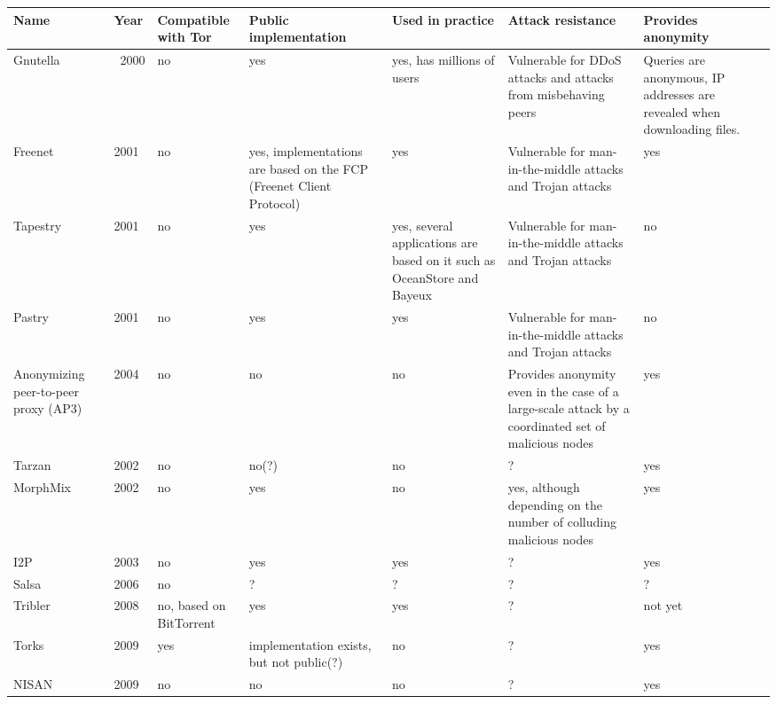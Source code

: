 \begin{center}
    \begin{longtable}{ | p{1.9cm} | p{0.8cm} | p{1.6cm} | p{2.2cm} | p{2.0cm} | p{2cm} | p{2cm} | p{2cm} |}
    \hline
    	Name & Year & Compatible with Tor & Public implementation & Used in practice & Attack resistance & Provides anonymity \\ \hline
	Gnutella & ~2000 & no & yes & yes, has millions of users & Vulnerable for DDoS attacks and attacks from misbehaving peers & Queries are anonymous, IP addresses are revealed when downloading files.\\ \hline
	Freenet & 2001 & no & yes, implementations are based on the FCP (Freenet Client Protocol) & yes & Vulnerable for man-in-the-middle attacks and Trojan attacks & yes\\ \hline
	Tapestry & 2001 & no & yes & yes, several applications are based on it such as OceanStore and Bayeux & Vulnerable for man-in-the-middle attacks and Trojan attacks & no\\ \hline
	Pastry & 2001 & no & yes & yes & Vulnerable for man-in-the-middle attacks and Trojan attacks & no\\ \hline
	Anonymizing peer-to-peer proxy (AP3) & 2004 & no & no & no & Provides anonymity even in the case of a large-scale attack by a coordinated set of malicious nodes & yes\\ \hline
	Tarzan & 2002 & no & no(?) & no & ? & yes\\ \hline
	MorphMix & 2002 & no & yes & no & yes, although depending on the number of colluding malicious nodes & yes\\ \hline
	I2P & 2003 & no & yes & yes & ? & yes\\ \hline
	Salsa & 2006 & no & ? & ? & ? & ?\\ \hline
	Tribler & 2008 & no, based on BitTorrent & yes & yes & ? & not yet\\ \hline
	Torks & 2009 & yes & implementation exists, but not public(?) & no & ? & yes\\ \hline
	NISAN & 2009 & no & no & no & ? & yes\\ \hline
    \end{longtable}
\end{center}